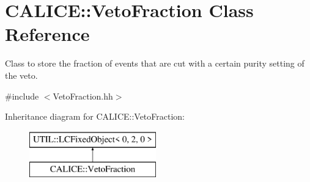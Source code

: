 \section{C\-A\-L\-I\-C\-E\-:\-:Veto\-Fraction Class Reference}
\label{classCALICE_1_1VetoFraction}


Class to store the fraction of events that are cut with a certain purity setting of the veto.  




{\ttfamily \#include $<$Veto\-Fraction.\-hh$>$}

Inheritance diagram for C\-A\-L\-I\-C\-E\-:\-:Veto\-Fraction\-:\begin{figure}[H]
\begin{center}
\leavevmode
\includegraphics[height=2.000000cm]{classCALICE_1_1VetoFraction}
\end{center}
\end{figure}
